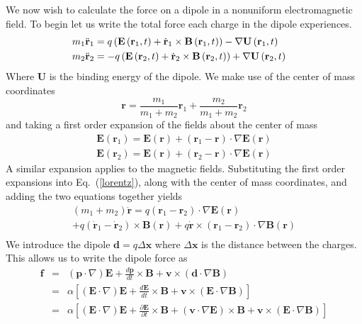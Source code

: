 \documentclass[twocolumn,english,pra,aps,superscriptaddress,floatfix]{revtex4-1}
\begin{document}
We now wish to calculate the force on a dipole in a nonuniform electromagnetic field.  To begin let us write the total force each charge in the dipole experiences.
\begin{eqnarray}
&m_1\ddot{\bf{r}}_1=q\left(\mathbf{E}\left(\mathbf{r}_1,t\right)+\dot{\mathbf{r}}_1\times\mathbf{B}\left(\mathbf{r}_1,t\right)\right)-\nabla\mathbf{U}\left(\mathbf{r}_1,t\right)&\nonumber \\
&m_2\ddot{\bf{r}}_2=-q\left(\mathbf{E}\left(\mathbf{r}_2,t\right)+\dot{\mathbf{r}}_2\times\mathbf{B}\left(\mathbf{r}_2,t\right)\right)+\nabla\mathbf{U}\left(\mathbf{r}_2,t\right)&  
\label{lorentz}
\end{eqnarray}
Where $\mathbf{U}$ is the binding energy of the dipole. We make use of the center of mass coordinates
\begin{equation}
\mathbf{r}=\frac{m_1}{m_1+m_2}\mathbf{r}_1+\frac{m_2}{m_1+m_2}\mathbf{r}_2
\label{com}
\end{equation}
and taking a first order expansion of the fields about the center of mass
\begin{eqnarray}
&\mathbf{E}\left(\mathbf{r}_1\right)=\mathbf{E}\left(\mathbf{r}\right)+\left(\mathbf{r}_1-\mathbf{r}\right)\cdot\nabla\mathbf{E}\left(\mathbf{r}\right)& \nonumber \\
&\mathbf{E}\left(\mathbf{r}_2\right)=\mathbf{E}\left(\mathbf{r}\right)+\left(\mathbf{r}_2-\mathbf{r}\right)\cdot\nabla\mathbf{E}\left(\mathbf{r}\right)&
\label{expansion}
\end{eqnarray}
A similar expansion applies to the magnetic fields. Substituting the first order expansions into Eq.\ (\ref{lorentz}), along with the center of mass coordinates, and adding the two equations together yields
\begin{eqnarray}
&\left(m_1+m_2\right)\ddot{\mathbf{r}}=q\left(\mathbf{r}_1-\mathbf{r}_2\right)\cdot\nabla\mathbf{E}\left(\mathbf{r}\right) &\nonumber \\
&+q\left(\dot{\mathbf{r}}_1-\dot{\mathbf{r}}_2\right)\times\mathbf{B}\left(\mathbf{r}\right)+q\dot{\mathbf{r}}\times\left(\mathbf{r}_1-\mathbf{r}_2\right)\cdot\nabla\mathbf{B}\left(\mathbf{r}\right)&\nonumber\\
\end{eqnarray}
We introduce the dipole $\mathbf{d}=q\Delta\mathbf{x}$ where $\Delta\mathbf{x}$ is the distance between the charges.  This allows us to write the dipole force as
\begin{eqnarray}
 \mathbf{f} &=& \left(\mathbf{p}\cdot\nabla\right)\mathbf{E}+\frac{d\mathbf{p}}{dt}\times\mathbf{B} +\mathbf{v}\times\left(\mathbf{d}\cdot\nabla\mathbf{B}\right)\nonumber \\
 &=& \alpha\left[\left(\mathbf{E}\cdot\nabla\right)\mathbf{E}+\frac{d\mathbf{E}}{dt}\times\mathbf{B}+\mathbf{v}\times\left(\mathbf{E}\cdot\nabla\mathbf{B}\right)\right] \nonumber \\
  &=& \alpha\left[\left(\mathbf{E}\cdot\nabla\right)\mathbf{E}+\frac{\partial\mathbf{E}}{\partial t}\times\mathbf{B}+\left(\mathbf{v}\cdot\nabla\mathbf{E}\right)\times\mathbf{B}+\mathbf{v}\times\left(\mathbf{E}\cdot\nabla\mathbf{B}\right)\right]\nonumber \\
\label{lorentz3}
\end{eqnarray}
\end{document}

